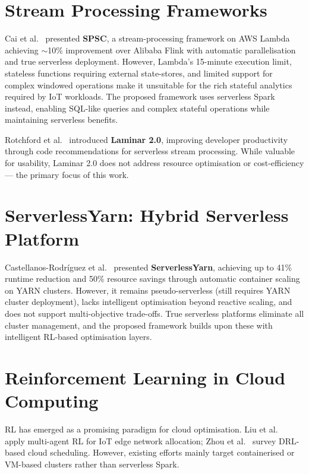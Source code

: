 \section{Stream Processing Frameworks}
Cai et al.~\cite{cai2024spsc} presented \textbf{SPSC}, a stream-processing framework
on AWS Lambda achieving $\sim$10\% improvement over Alibaba Flink with automatic
parallelisation and true serverless deployment. However, Lambda's 15-minute execution
limit, stateless functions requiring external state-stores, and limited support for
complex windowed operations make it unsuitable for the rich stateful analytics required
by IoT workloads. The proposed framework uses serverless Spark instead, enabling
SQL-like queries and complex stateful operations while maintaining serverless benefits.

Rotchford et al.~\cite{rotchford2024laminar} introduced \textbf{Laminar 2.0}, improving
developer productivity through code recommendations for serverless stream processing.
While valuable for usability, Laminar 2.0 does not address resource optimisation or
cost-efficiency — the primary focus of this work.

\section{ServerlessYarn: Hybrid Serverless Platform}
Castellanos-Rodríguez et al.~\cite{castellanos2024serverlessyarn} presented
\textbf{ServerlessYarn}, achieving up to 41\% runtime reduction and 50\% resource
savings through automatic container scaling on YARN clusters. However, it remains
pseudo-serverless (still requires YARN cluster deployment), lacks intelligent
optimisation beyond reactive scaling, and does not support multi-objective trade-offs.
True serverless platforms eliminate all cluster management, and the proposed framework
builds upon these with intelligent RL-based optimisation layers.

\section{Reinforcement Learning in Cloud Computing}
RL has emerged as a promising paradigm for cloud optimisation. Liu et
al.~\cite{liu2020edge} apply multi-agent RL for IoT edge network allocation; Zhou et
al.~\cite{zhou2024deep} survey DRL-based cloud scheduling. However, existing efforts
mainly target containerised or VM-based clusters rather than serverless Spark.

